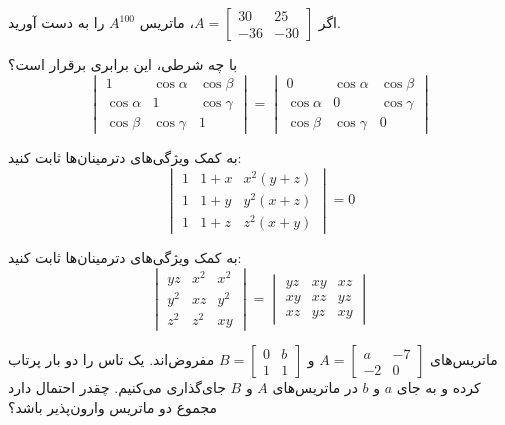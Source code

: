 \begin{problem} \label{prmat6}
	اگر
	$A=
	\begin{bmatrix}
		30 & 25 \\
		-36 & -30
	\end{bmatrix}$،
	ماتریس
	$A^{100}$
	را به دست آورید.
\end{problem}

\begin{problem} \label{prmat7}
	با چه شرطی، این برابری برقرار است؟
	\[
	\begin{vmatrix}
		1 & \cos\alpha & \cos\beta \\
		\cos\alpha & 1 & \cos\gamma \\
		\cos\beta & \cos\gamma & 1
	\end{vmatrix}
	=
	\begin{vmatrix}
		0 & \cos\alpha & \cos\beta \\
		\cos\alpha & 0 & \cos\gamma \\
		\cos\beta & \cos\gamma & 0
	\end{vmatrix}
	\]
\end{problem}

\begin{problem} \label{prmat8}
	به کمک ویژگی‌های دترمینان‌ها ثابت کنید:
	\[
	\begin{vmatrix}
		1 & 1+x & x^2(y+z) \\
		1 & 1+y & y^2(x+z) \\
		1 & 1+z & z^2(x+y)
	\end{vmatrix} = 0
	\]
\end{problem}

\begin{problem} \label{prmat9}
	به کمک ویژگی‌های دترمینان‌ها ثابت کنید:
	\[
	\begin{vmatrix}
		yz & x^2 & x^2 \\
		y^2 & xz & y^2 \\
		z^2 & z^2 & xy
	\end{vmatrix}
	=
	\begin{vmatrix}
		yz & xy & xz \\
		xy & xz & yz \\
		xz & yz & xy
	\end{vmatrix}
	\]
\end{problem}

\begin{problem} \label{prmat10}
	ماتریس‌های
	$A=
	\begin{bmatrix}
		a & -7 \\
		-2 & 0
	\end{bmatrix}$
	و
	$B=
	\begin{bmatrix}
		0 & b \\
		1 & 1
	\end{bmatrix}$
	مفروض‌اند. یک تاس را دو بار پرتاب کرده و به جای $a$ و $b$ در ماتریس‌های $A$ و $B$ جای‌گذاری می‌کنیم. چقدر احتمال دارد مجموع دو ماتریس وارون‌پذیر باشد؟
\end{problem}

